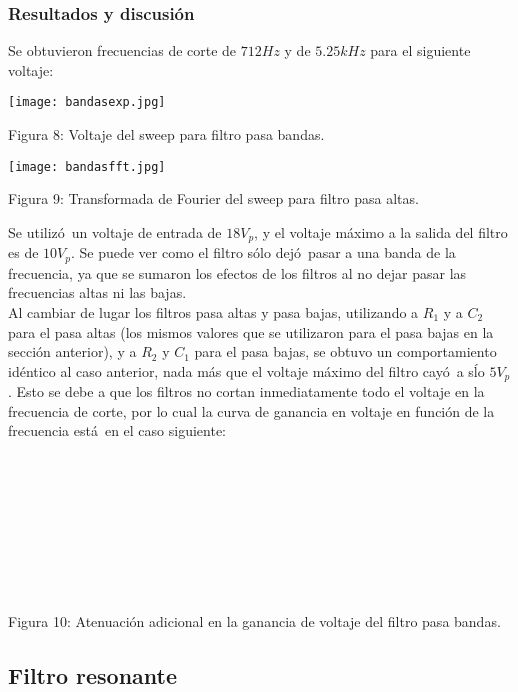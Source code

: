 \documentclass[11pt]{article}
\renewcommand{\=}[1]{\stackrel{#1}{=}} %
\theoremstyle{definition}
\theoremstyle{remark}
\begin{document}
\subsubsection{Resultados y discusi\'on}
Se obtuvieron frecuencias de corte de $712Hz$ y de $5.25kHz$ para el siguiente voltaje:
\begin{center}
\texttt{[image: bandasexp.jpg]}
\end{center}
\begin{center}
Figura 8: Voltaje del sweep para filtro pasa bandas.
\end{center}
\begin{center}
\texttt{[image: bandasfft.jpg]}
\end{center}
\begin{center}
Figura 9: Transformada de Fourier del sweep para filtro pasa altas.
\end{center}
Se utiliz\'o\ un voltaje de entrada de $18V_p$, y el voltaje m\'aximo a la salida del filtro es de $10V_p$. Se puede ver como el filtro s\'olo dej\'o\ pasar a una banda de la frecuencia, ya que se sumaron los efectos de los filtros al no dejar pasar las frecuencias altas ni las bajas. \\
Al cambiar de lugar los filtros pasa altas y pasa bajas, utilizando a $R_1$ y a $C_2$ para el pasa altas (los mismos valores que se utilizaron para el pasa bajas en la secci\'on anterior), y a $R_2$ y $C_1$ para el pasa bajas, se obtuvo un comportamiento id\'entico al caso anterior, nada m\'as que el voltaje m\'aximo del filtro cay\'o\ a s\'lo $5V_p$. Esto se debe a que los filtros no cortan inmediatamente todo el voltaje en la frecuencia de corte, por lo cual la curva de ganancia en voltaje en funci\'on de la frecuencia est\'a\ en el caso siguiente: \\ \\ \\ \\ \\ \\ \\ \\ \\
\begin{center}
\vspace{5cm}
\end{center}
\begin{center}
Figura 10: Atenuaci\'on adicional en la ganancia de voltaje del filtro pasa bandas.
\end{center}

\subsection{Filtro resonante}
\end{document}
